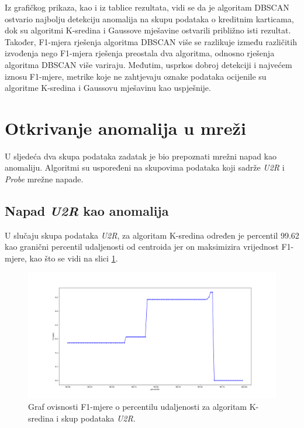 \documentclass[utf8, diplomski, numeric]{fer}
\begin{document}
Iz grafičkog prikaza, kao i iz tablice rezultata, vidi se da je algoritam DBSCAN ostvario najbolju detekciju anomalija na skupu podataka o kreditnim karticama, dok su algoritmi K-sredina i Gaussove mješavine ostvarili približno isti rezultat. Također, F1-mjera rješenja algoritma DBSCAN više se razlikuje između različitih izvođenja nego F1-mjera rješenja preostala dva algoritma, odnosno rješenja algoritma DBSCAN više variraju. Međutim, usprkos dobroj detekciji i najvećem iznosu F1-mjere, metrike koje ne zahtjevaju oznake podataka ocijenile su algoritme K-sredina i Gaussovu mješavinu kao uspješnije.

\section{Otkrivanje anomalija u mreži}
U sljedeća dva skupa podataka zadatak je bio prepoznati mrežni napad kao anomaliju. Algoritmi su uspoređeni na skupovima podataka koji sadrže \textit{U2R} i \textit{Probe}  mrežne napade.

\subsection{Napad \textit{U2R} kao anomalija}
U slučaju skupa podataka \textit{U2R}, za algoritam K-sredina određen je percentil 99.62 kao granični percentil udaljenosti od centroida jer on maksimizira vrijednost F1-mjere, kao što se vidi na slici \ref{fig:u2r-kmeans}.

\begin{figure}[h!]
\includegraphics[width=1\textwidth]{images/u2r-kmeans-f1.png}
\centering
\caption{Graf ovisnosti F1-mjere o percentilu udaljenosti za algoritam K-sredina i skup podataka \textit{U2R}.}
\label{fig:u2r-kmeans}
\end{figure}
\end{document}
